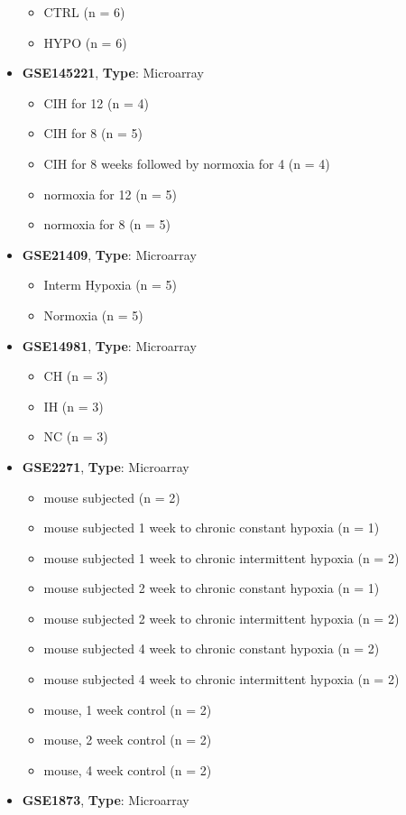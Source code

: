 \documentclass[
]{article}
\providecommand{\tightlist}{%
  \setlength{\itemsep}{0pt}\setlength{\parskip}{0pt}}
\begin{document}
\begin{itemize}
  \begin{itemize}
  \tightlist
  \item
    CTRL (n = 6)
  \item
    HYPO (n = 6)
  \end{itemize}
\item
  \textbf{GSE145221}, \textbf{Type}: Microarray

  \begin{itemize}
  \tightlist
  \item
    CIH for 12 (n = 4)
  \item
    CIH for 8 (n = 5)
  \item
    CIH for 8 weeks followed by normoxia for 4 (n = 4)
  \item
    normoxia for 12 (n = 5)
  \item
    normoxia for 8 (n = 5)
  \end{itemize}
\item
  \textbf{GSE21409}, \textbf{Type}: Microarray

  \begin{itemize}
  \tightlist
  \item
    Interm Hypoxia (n = 5)
  \item
    Normoxia (n = 5)
  \end{itemize}
\item
  \textbf{GSE14981}, \textbf{Type}: Microarray

  \begin{itemize}
  \tightlist
  \item
    CH (n = 3)
  \item
    IH (n = 3)
  \item
    NC (n = 3)
  \end{itemize}
\item
  \textbf{GSE2271}, \textbf{Type}: Microarray

  \begin{itemize}
  \tightlist
  \item
    mouse subjected (n = 2)
  \item
    mouse subjected 1 week to chronic constant hypoxia (n = 1)
  \item
    mouse subjected 1 week to chronic intermittent hypoxia (n = 2)
  \item
    mouse subjected 2 week to chronic constant hypoxia (n = 1)
  \item
    mouse subjected 2 week to chronic intermittent hypoxia (n = 2)
  \item
    mouse subjected 4 week to chronic constant hypoxia (n = 2)
  \item
    mouse subjected 4 week to chronic intermittent hypoxia (n = 2)
  \item
    mouse, 1 week control (n = 2)
  \item
    mouse, 2 week control (n = 2)
  \item
    mouse, 4 week control (n = 2)
  \end{itemize}
\item
  \textbf{GSE1873}, \textbf{Type}: Microarray


\end{itemize}
\end{document}

